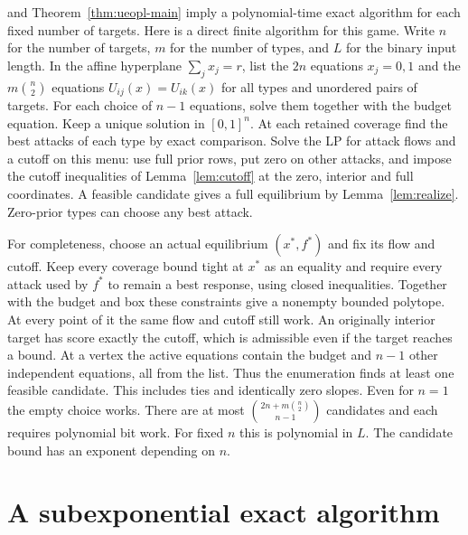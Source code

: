 \begin{remark}\label{rem:ueopl-fixeddim}
\cite[Theorem~40]{fgms18} and Theorem~\ref{thm:ueopl-main} imply a
polynomial-time exact algorithm for each fixed number of targets.
Here is a direct finite algorithm for this game. Write $n$ for the
number of targets, $m$ for the number of types, and $L$ for the binary
input length. In the affine hyperplane $\sum_jx_j=r$, list the
$2n$ equations $x_j=0,1$ and the $m\binom n2$ equations
$U_{ij}(x)=U_{ik}(x)$ for all types and unordered pairs of targets.
For each choice of $n-1$ equations, solve them together with the budget
equation. Keep a unique solution in $[0,1]^n$. At each retained
coverage find the best attacks of each type by exact comparison.
Solve the LP for attack flows and a cutoff on this menu: use full
prior rows, put zero on other attacks, and impose the cutoff
inequalities of Lemma~\ref{lem:cutoff} at the zero, interior and full
coordinates. A feasible candidate gives a full equilibrium by
Lemma~\ref{lem:realize}. Zero-prior types can choose any best attack.

For completeness, choose an actual equilibrium $(x^*,f^*)$ and fix its
flow and cutoff. Keep every coverage bound tight at $x^*$ as an
equality and require every attack used by $f^*$ to remain a best
response, using closed inequalities. Together with the budget and box
these constraints give a nonempty bounded polytope. At every point of
it the same flow and cutoff still work. An originally interior target
has score exactly the cutoff, which is admissible even if the target
reaches a bound. At a vertex the active equations contain the budget
and $n-1$ other independent equations, all from the list. Thus the
enumeration finds at least one feasible candidate. This includes ties
and identically zero slopes. Even for $n=1$ the empty choice works.
There are at most $\binom{2n+m\binom n2}{n-1}$ candidates and each
requires polynomial bit work. For fixed $n$ this is polynomial in $L$.
The candidate bound has an exponent depending on $n$.
\end{remark}
\par

\section{A subexponential exact algorithm}\label{sec:subexp}

